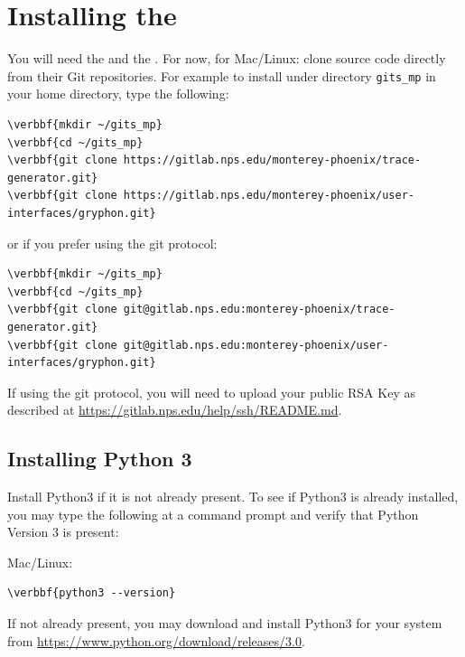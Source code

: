 \documentclass[11pt,fleqn]{article} %
\begin{document}
\section{Installing the \mpgt}
You will need the \ggui and the \gtg.
For now, for Mac/Linux: clone \mpgt source code directly from their Git repositories.  For example to install under directory \verb+gits_mp+ in your home directory, type the following:
\begin{Verbatim}[commandchars=\\\{\}]
\verbbf{mkdir ~/gits_mp}
\verbbf{cd ~/gits_mp}
\verbbf{git clone https://gitlab.nps.edu/monterey-phoenix/trace-generator.git}
\verbbf{git clone https://gitlab.nps.edu/monterey-phoenix/user-interfaces/gryphon.git}
\end{Verbatim}

or if you prefer using the git protocol:
\begin{Verbatim}[commandchars=\\\{\}]
\verbbf{mkdir ~/gits_mp}
\verbbf{cd ~/gits_mp}
\verbbf{git clone git@gitlab.nps.edu:monterey-phoenix/trace-generator.git}
\verbbf{git clone git@gitlab.nps.edu:monterey-phoenix/user-interfaces/gryphon.git}
\end{Verbatim}

If using the git protocol, you will need to upload your public RSA Key as described at \url{https://gitlab.nps.edu/help/ssh/README.md}.\\

\subsection{Installing Python 3}
Install Python3 if it is not already present. To see if Python3 is already installed, you may type the following at a command prompt and verify that Python Version 3 is present:
\begin{compactitem}
\item Mac/Linux:
\begin{Verbatim}[commandchars=\\\{\}]
\verbbf{python3 --version}
\end{Verbatim}
\end{compactitem}
If not already present, you may download and install Python3 for your system from \url{https://www.python.org/download/releases/3.0}.\\
\end{document}

